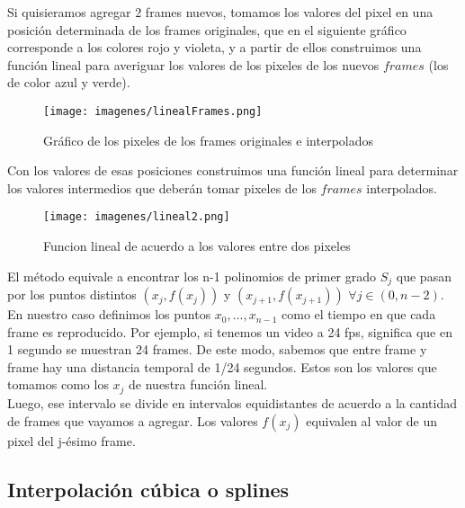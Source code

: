 Si quisieramos agregar 2 frames nuevos, tomamos los valores del pixel en una posición determinada de los frames originales, que en el siguiente gráfico corresponde a los colores rojo y violeta, y a partir de ellos construimos una función lineal para averiguar los valores de los pixeles de los nuevos $frames$ (los de color azul y verde).


\begin{figure}[h!]
  \centering
    \texttt{[image: imagenes/linealFrames.png]}
  \caption{Gráfico de los pixeles de los frames originales e interpolados}
\end{figure}

Con los valores de esas posiciones construimos una función lineal para determinar los valores intermedios que deberán tomar pixeles de los $frames$ interpolados.

\begin{figure}[h!]
  \centering
    \texttt{[image: imagenes/lineal2.png]}
  \caption{Funcion lineal de acuerdo a los valores entre dos pixeles}
\end{figure}


El método equivale a encontrar los n-1 polinomios de primer grado $S_{j}$ que pasan por los puntos distintos $(x_{j},f(x_{j}))$ y $(x_{j+1},f(x_{j+1}))$ $\forall j \in (0,n-2)$.\\
En nuestro caso definimos los puntos $x_{0}, ... , x_{n-1}$ como el tiempo en que cada frame es reproducido. Por ejemplo, si tenemos un video a 24 fps, significa que en 1 segundo se muestran 24 frames. De este modo, sabemos que entre frame y frame hay una distancia temporal de 1/24 segundos. Estos son los valores que tomamos como los $x_{j}$ de nuestra función lineal. \\
Luego, ese intervalo se divide en intervalos equidistantes de acuerdo a la cantidad de frames que vayamos a agregar. Los valores $f(x_{j})$ equivalen al valor de un pixel del j-ésimo frame. 




\subsection{Interpolación cúbica o splines}

